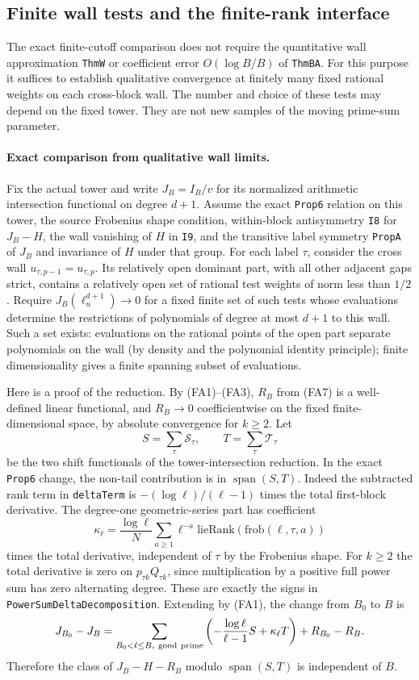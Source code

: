 \subsection{Finite wall tests and the finite-rank interface}
\label{sec:flag-finite-wall}
The exact finite-cutoff comparison does not require the quantitative
wall approximation \texttt{ThmW} or coefficient error
\(O(\log B/B)\) of \texttt{ThmBA}. For this purpose it suffices
to establish qualitative convergence at finitely many fixed
rational weights on each cross-block wall. The number and choice
of these tests may depend on the fixed tower. They are not
new samples of the moving prime-sum parameter.

\paragraph{Exact comparison from qualitative wall limits.}
Fix the actual tower and write \(J_B=I_B/v\) for its normalized
arithmetic intersection functional on degree \(d+1\).
Assume the exact \texttt{Prop6} relation on this tower, the
source Frobenius shape condition, within-block antisymmetry
\texttt{I8} for \(J_B-H\), the wall vanishing of \(H\) in
\texttt{I9}, and the transitive label symmetry \texttt{PropA}
of \(J_B\) and invariance of \(H\) under that group.
For each label \(\tau\), consider the cross wall
\(u_{\tau,p-1}=u_{\tau,p}\). Its relatively open dominant
part, with all other adjacent gaps strict, contains a
relatively open set of rational test weights of norm
less than \(1/2\). Require \(J_B(\ell_u^{d+1})\to0\) for
a fixed finite set of such tests whose evaluations determine
the restrictions of polynomials of degree at most \(d+1\)
to this wall. Such a set exists: evaluations on the rational
points of the open part separate polynomials on the wall
(by density and the polynomial identity principle); finite
dimensionality gives a finite spanning subset of evaluations.

Here is a proof of the reduction. By (FA1)--(FA3), \(R_B\)
from (FA7) is a well-defined linear functional, and \(R_B\to0\)
coefficientwise on the fixed finite-dimensional space, by
absolute convergence for \(k\ge2\). Let
\[
 S=\sum_\tau\mathcal S_\tau,\qquad T=\sum_\tau\mathcal T_\tau
\]
be the two shift functionals of the tower-intersection reduction.
In the exact \texttt{Prop6} change, the non-tail contribution
is in \(\operatorname{span}(S,T)\). Indeed the subtracted
rank term in \texttt{deltaTerm} is
\(-(\log\ell)/(\ell-1)\) times the total first-block derivative.
The degree-one geometric-series part has coefficient
\[
 \kappa_\ell=\frac{\log\ell}{N}\sum_{a\ge1}\ell^{-a}
                 \mathrm{lieRank}(\mathrm{frob}(\ell,\tau,a))
\]
times the total derivative, independent of \(\tau\) by
the Frobenius shape. For \(k\ge2\) the total derivative is
zero on \(p_{\tau k}Q_{\tau k}\), since multiplication by
a positive full power sum has zero alternating degree.
These are exactly the signs in
\texttt{PowerSumDeltaDecomposition}. Extending by (FA1), the
change from \(B_0\) to \(B\) is
\[
 J_{B_0}-J_B
  =\sum_{B_0<\ell\le B,\ {\rm good\ prime}}
       \left(-\frac{\log\ell}{\ell-1}S+\kappa_\ell T\right)
       +R_{B_0}-R_B .
\]
Therefore the class of \(J_B-H-R_B\) modulo
\(\operatorname{span}(S,T)\) is independent of \(B\).

